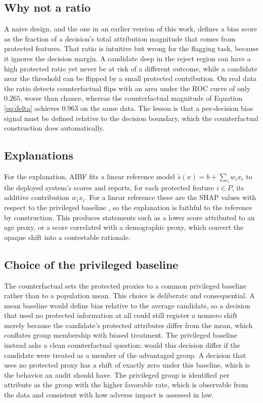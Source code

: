 \documentclass[conference]{IEEEtran}
\begin{document}
\subsection{Why not a ratio}
A naive design, and the one in an earlier version of this work, defines a bias score
as the fraction of a decision's total attribution magnitude that comes from protected
features. That ratio is intuitive but wrong for the flagging task, because it ignores
the decision margin. A candidate deep in the reject region can have a high protected
ratio yet never be at risk of a different outcome, while a candidate near the
threshold can be flipped by a small protected contribution. On real data the ratio
detects counterfactual flips with an area under the ROC curve of only $0.265$, worse
than chance, whereas the counterfactual magnitude of Equation \eqref{eq:delta}
achieves $0.963$ on the same data. The lesson is that a per-decision bias signal must
be defined relative to the decision boundary, which the counterfactual construction
does automatically.

\subsection{Explanations}
For the explanation, AIBF fits a linear reference model $\hat{s}(x)=b+\sum_i w_i x_i$
to the deployed system's scores and reports, for each protected feature $i\in P$, its
additive contribution $w_i x_i$. For a linear reference these are the SHAP values with
respect to the privileged baseline \cite{shap}, so the explanation is faithful to the
reference by construction. This produces statements such as a lower score attributed
to an age proxy, or a score correlated with a demographic proxy, which convert the
opaque shift into a contestable rationale.

\subsection{Choice of the privileged baseline}
The counterfactual sets the protected proxies to a common privileged baseline rather
than to a population mean. This choice is deliberate and consequential. A mean
baseline would define bias relative to the average candidate, so a decision that used
no protected information at all could still register a nonzero shift merely because the
candidate's protected attributes differ from the mean, which conflates group
membership with biased treatment. The privileged baseline instead asks a clean
counterfactual question: would this decision differ if the candidate were treated as a
member of the advantaged group. A decision that uses no protected proxy has a shift of
exactly zero under this baseline, which is the behavior an audit should have. The
privileged group is identified per attribute as the group with the higher favorable
rate, which is observable from the data and consistent with how adverse impact is
assessed in law.
\end{document}
